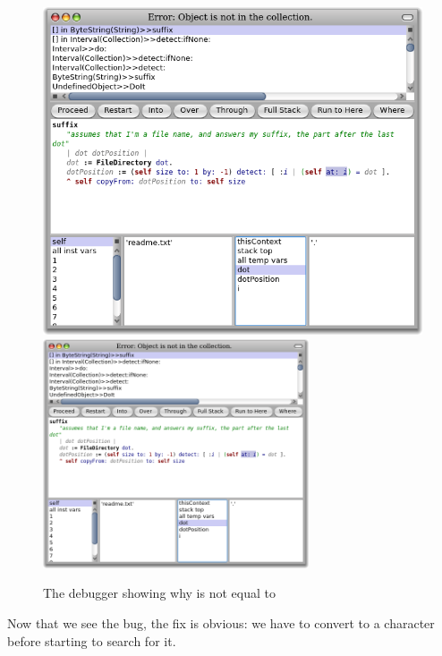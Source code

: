 \documentclass[a4paper,10pt,twoside]{book}
\begin{document}
\begin{figure}[btp]
	\begin{center}
	\ifluluelse
		{\includegraphics[width=\textwidth]{dotIsAString}}
		{\includegraphics[width=0.7\textwidth]{dotIsAString}}
	\end{center}
	\caption{The debugger showing why  is not equal to }
\end{figure}

Now that we see the bug, the fix is obvious: we have to convert  to a character before starting to search for it.  
\end{document}
